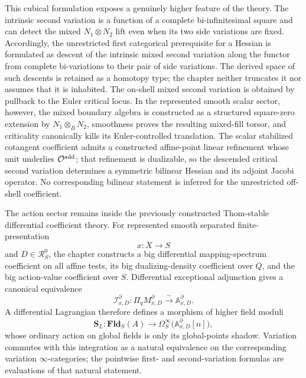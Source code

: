 This cubical formulation exposes a genuinely higher feature of the theory. The intrinsic second variation is a function of a complete bi-infinitesimal square and can detect the mixed \(N_1\otimes N_2\) lift even when its two side variations are fixed. Accordingly, the unrestricted first categorical prerequisite for a Hessian is formulated as descent of the intrinsic mixed second variation along the functor from complete bi-variations to their pair of side variations. The derived space of such descents is retained as a homotopy type; the chapter neither truncates it nor assumes that it is inhabited. The on-shell mixed second variation is obtained by pullback to the Euler critical locus. In the represented smooth scalar sector, however, the mixed boundary algebra is constructed as a structured square-zero extension by \(N_1\otimes_BN_2\), smoothness proves the resulting mixed-fill torsor, and criticality canonically kills its Euler-controlled translation. The scalar stabilized cotangent coefficient admits a constructed affine-point linear refinement whose unit underlies \(\mathcal O^{\mathrm{add}}\); that refinement is dualizable, so the descended critical second variation determines a symmetric bilinear Hessian and its adjoint Jacobi operator. No corresponding bilinear statement is inferred for the unrestricted off-shell coefficient.

The action sector remains inside the previously constructed Thom-stable differential coefficient theory. For represented smooth separated finite-presentation
\[
    x:X\longrightarrow S
\]
and \(D\in\mathcal R_S^0\), the chapter constructs a big differential mapping-spectrum coefficient on all affine tests, its big dualizing-density coefficient over \(Q\), and the big action-value coefficient over \(S\). Differential exceptional adjunction gives a canonical equivalence
\[
    \mathcal I^\partial_{x,D}:
    \Pi_qM^\partial_{x,D}
    \xrightarrow{\sim}
    \mathbb A^\partial_{x,D}.
\]
A differential Lagrangian therefore defines a morphism of higher field moduli
\[
    \mathbf S_L:
    \mathbf{Fld}_S(A)
    \longrightarrow
    \Omega_S^\infty\bigl(\mathbb A^\partial_{x,D}[n]\bigr),
\]
whose ordinary action on global fields is only its global-points shadow. Variation commutes with this integration as a natural equivalence on the corresponding variation \(\infty\)-categories; the pointwise first- and second-variation formulas are evaluations of that natural statement.

